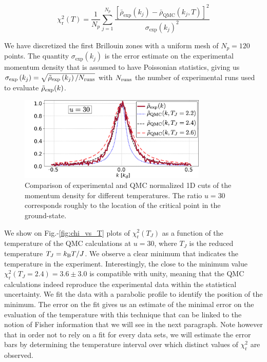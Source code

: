 \begin{equation}
    \chi_{\mathrm{r}}^{2}(T)=\frac{1}{N_{p}} \sum_{j=1}^{N_{p}} \frac{\left[\bar{\rho}_{\mathrm{exp}}\left(k_{j}\right)-\bar{\rho}_{\mathrm{QMC}}\left(k_{j}, T\right)\right]^{2}}{\sigma_{\exp }\left(k_{j}\right)^{2}}
\end{equation}

\noindent We have discretized the first Brillouin zones with a uniform mesh of $N_p=120$ points. The quantity $\sigma_{\exp }\left(k_{j}\right)$ is the error estimate on the experimental momentum density that is assumed to have Poissonian statistics, giving us $\sigma_{\exp }\left(k_{j}\right)=\sqrt{\tilde{\rho}_{\exp }\left(k_{j}\right) / N_{\rm{runs}}}$ with $N_{\rm{runs}}$ the number of experimental runs used to evaluate $\tilde{\rho}_{\rm{exp}}(k)$.


\begin{figure}
    \centering
    \includegraphics[width=0.8\textwidth]{Fig/Chapter3/comp_qmc.png}
    \caption{Comparison of experimental and QMC normalized 1D cuts of the momentum density for different temperatures. The ratio $u=30$ corresponds roughly to the location of the critical point in the ground-state.}
    \label{fig:comp_qmc}
\end{figure}

We show on Fig.-\ref{fig:chi_vs_T} plots of $\chi_{\mathrm{r}}^{2}(T_J)$ as a function of the temperature of the QMC calculations at $u=30$, where $T_J$ is the reduced temperature $T_J = k_{\mathrm{B}} T /J$. We observe a clear minimum that indicates the temperature in the experiment. Interestingly, the close to the minimum value $\chi_{\mathrm{r}}^{2}\left(T_{J}=2.4\right)=3.6 \pm 3.0$ is compatible with unity, meaning that the QMC calculations indeed reproduce the experimental data within the statistical uncertainty. We fit the data with a parabolic profile to identify the position of the minimum. The error on the fit gives us an estimate of the minimal error on the evaluation of the temperature with this technique that can be linked to the notion of Fisher information that we will see in the next paragraph. Note however that in order not to rely on a fit for every data sets, we will estimate the error bars by determining the temperature interval over which distinct values of $\chi_{\mathrm{r}}^{2}$ are observed.


